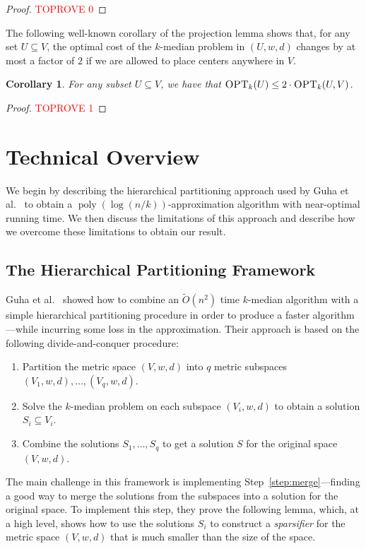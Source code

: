 \documentclass[11pt]{article}
\newcommand{\1}{\mathmybb{1}}
\newtheorem{corollary}[theorem]{Corollary}
\DeclareMathOperator*{\poly}{poly}
\newcommand{\OPT}{\textsc{OPT}}
\begin{document}
\begin{proof}\textcolor{red}{TOPROVE 0}\end{proof}


The following well-known corollary of the projection lemma shows that, for any set $U \subseteq V$, the optimal cost of the $k$-median problem in $(U,w,d)$ changes by at most a factor of $2$ if we are allowed to place centers anywhere in $V$.

\begin{corollary}\label{cor:improper}
    For any subset $U \subseteq V$, we have that $\OPT_k(U) \leq 2 \cdot \OPT_k(U,V)$.
\end{corollary}

\begin{proof}\textcolor{red}{TOPROVE 1}\end{proof}

 

\section{Technical Overview}\label{sec:tech}

We begin by describing the hierarchical partitioning approach used by Guha et al.~\cite{focs/GuhaMMO00} to obtain a $\poly(\log(n/k))$-approximation algorithm with near-optimal running time. We then discuss the limitations of this approach and describe how we overcome these limitations to obtain our result.

\subsection{The Hierarchical Partitioning Framework}


Guha et al.~\cite{focs/GuhaMMO00} showed how to combine an $\tilde O(n^2)$ time $k$-median algorithm with a simple hierarchical partitioning procedure in order to produce a faster algorithm---while incurring some loss in the approximation. Their approach is based on the following divide-and-conquer procedure: 
\begin{enumerate}
    \item Partition the metric space $(V,w,d)$ into $q$ metric subspaces $(V_1,w,d), \dots, (V_q,w,d)$.
    \vspace{-0.2cm}
    \item Solve the $k$-median problem on each subspace $(V_i,w,d)$ to obtain a solution $S_i \subseteq V_i$.
    \vspace{-0.2cm}
    \item Combine the solutions $S_1,\dots,S_q$ to get a solution $S$ for the original space $(V,w,d)$.\label{step:merge}
\end{enumerate}
The main challenge in this framework is implementing Step~\ref{step:merge}---finding a good way to merge the solutions from the subspaces into a solution for the original space. To implement this step, they prove the following lemma, which, at a high level, shows how to use the solutions $S_i$ to construct a \emph{sparsifier} for the metric space $(V,w,d)$ that is much smaller than the size of the space.
\end{document}
